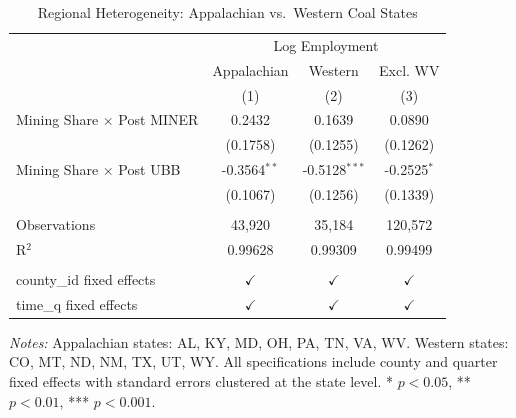 \begin{table}[htbp]
   \caption{\label{tab:regional} Regional Heterogeneity: Appalachian vs.\ Western Coal States}
   \bigskip
   \centering
   \begin{tabular}{lccc}
      \toprule
       & \multicolumn{3}{c}{Log Employment}\\
                                        & Appalachian    & Western         & Excl. WV \\   
                                        & (1)            & (2)             & (3)\\  
      \midrule 
      Mining Share $\times$ Post MINER  & 0.2432         & 0.1639          & 0.0890\\   
                                        & (0.1758)       & (0.1255)        & (0.1262)\\   
      Mining Share $\times$ Post UBB    & -0.3564$^{**}$ & -0.5128$^{***}$ & -0.2525$^{*}$\\   
                                        & (0.1067)       & (0.1256)        & (0.1339)\\   
       \\
      Observations                      & 43,920         & 35,184          & 120,572\\  
      R$^2$                             & 0.99628        & 0.99309         & 0.99499\\  
       \\
      county\_id fixed effects          & $\checkmark$   & $\checkmark$    & $\checkmark$\\   
      time\_q fixed effects             & $\checkmark$   & $\checkmark$    & $\checkmark$\\   
      \bottomrule
   \end{tabular}
   
   \par \raggedright
   \textit{Notes:} Appalachian states: AL, KY, MD, OH, PA, TN, VA, WV. Western states: CO, MT, ND, NM, TX, UT, WY. All specifications include county and quarter fixed effects with standard errors clustered at the state level. * $p<0.05$, ** $p<0.01$, *** $p<0.001$.
\end{table}
